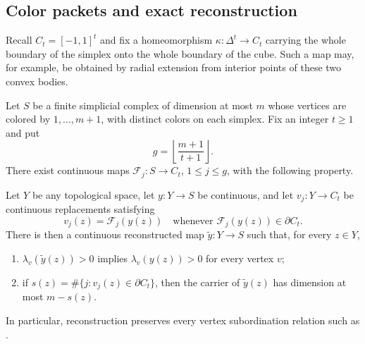 \subsection{Color packets and exact reconstruction}

Recall $C_t=[-1,1]^t$ and fix a homeomorphism
$\kappa:\Delta^t\to C_t$ carrying the whole boundary of the
simplex onto the whole boundary of the cube.  Such a map may, for
example, be obtained by radial extension from interior points of
these two convex bodies.

\begin{lemma}
\label{lem:packet-reconstruction}
Let $S$ be a finite simplicial complex of dimension at most $m$
whose vertices are colored by $1,\ldots,m+1$, with distinct colors
on each simplex.  Fix an integer $t\ge1$ and put
\[
 g=\left\lfloor\frac{m+1}{t+1}\right\rfloor.
\]
There exist continuous maps $\mathcal F_j:S\to C_t$,
$1\le j\le g$, with the following property.

Let $Y$ be any topological space, let $y:Y\to S$ be continuous,
and let $v_j:Y\to C_t$ be continuous replacements satisfying
\begin{equation}
\label{eq:packet-boundary-condition}
 v_j(z)=\mathcal F_j(y(z))
 \quad\text{whenever }\mathcal F_j(y(z))\in\partial C_t.
\end{equation}
There is then a continuous reconstructed map
$\widetilde y:Y\to S$ such that, for every $z\in Y$,
\begin{enumerate}
 \item $\lambda_v(\widetilde y(z))>0$ implies
       $\lambda_v(y(z))>0$ for every vertex $v$;
 \item if $s(z)=\#\{j:v_j(z)\in\partial C_t\}$, then the carrier
       of $\widetilde y(z)$ has dimension at most $m-s(z)$.
\end{enumerate}
In particular, reconstruction preserves every vertex
subordination relation such as .
\end{lemma}

